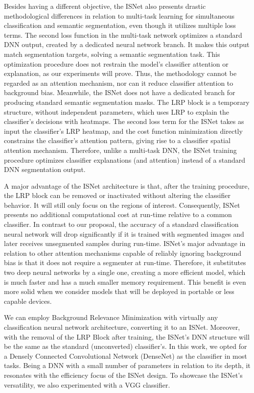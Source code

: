\documentclass[fleqn,10pt]{wlscirep}
\begin{document}
Besides having a different objective, the ISNet also presents drastic methodological differences in relation to multi-task learning for simultaneous classification and semantic segmentation, even though it utilizes multiple loss terms. The second loss function in the multi-task network optimizes a standard DNN output, created by a dedicated neural network branch. It makes this output match segmentation targets, solving a semantic segmentation task. This optimization procedure does not restrain the model's classifier attention or explanation, as our experiments will prove. Thus, the methodology cannot be regarded as an attention mechanism, nor can it reduce classifier attention to background bias. Meanwhile, the ISNet does not have a dedicated branch for producing standard semantic segmentation masks. The LRP block is a temporary structure, without independent parameters, which uses LRP to explain the classifier's decisions with heatmaps. The second loss term for the ISNet takes as input the classifier's LRP heatmap, and the cost function minimization directly constrains the classifier's attention pattern, giving rise to a classifier spatial attention mechanism. Therefore, unlike a multi-task DNN, the ISNet training procedure optimizes classifier explanations (and attention) instead of a standard DNN segmentation output.

A major advantage of the ISNet architecture is that, after the training procedure, the LRP block can be removed or inactivated without altering the classifier behavior. It will still only focus on the regions of interest. Consequently, ISNet presents no additional computational cost at run-time relative to a common classifier. In contrast to our proposal, the accuracy of a standard classification neural network will drop significantly if it is trained with segmented images and later receives unsegmented samples during run-time. ISNet's major advantage in relation to other attention mechanisms capable of reliably ignoring background bias is that it does not require a segmenter at run-time. Therefore, it substitutes two deep neural networks by a single one, creating a more efficient model, which is much faster and has a much smaller memory requirement. This benefit is even more solid when we consider models that will be deployed in portable or less capable devices.

We can employ Background Relevance Minimization with virtually any classification neural network architecture, converting it to an ISNet. Moreover, with the removal of the LRP Block after training, the ISNet's DNN structure will be the same as the standard (unconverted) classifier's. In this work, we opted for a Densely Connected Convolutional Network\cite{DenseNet} (DenseNet) as the classifier in most tasks. Being a DNN with a small number of parameters in relation to its depth, it resonates with the efficiency focus of the ISNet design. To showcase the ISNet's versatility, we also experimented with a VGG\cite{vggOriginal} classifier.
\end{document}
